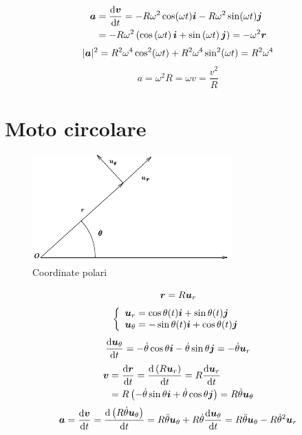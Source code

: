 \begin{align*}
\boldsymbol{a}&=\frac{\mathrm{d}\boldsymbol{v}}{\mathrm{d} t}=-R\omega^2\cos(\omega t)\boldsymbol{i}-R\omega^2\sin(\omega t)\boldsymbol{j}\\
&=-R\omega^2\left(\cos\left(\omega t\right)\boldsymbol{i}+
\sin\left(\omega t\right)\boldsymbol{j}\right)=-\omega^2\boldsymbol{r}
\end{align*}
\begin{equation*}|\boldsymbol{a}|^2=R^2\omega^4\cos^2(\omega t)+R^2\omega^4\sin^2(\omega
t)=R^2\omega^4\end{equation*}
\begin{equation*}a=\omega^2R=\omega v=\frac{v^2}{R}\end{equation*}
\section{Moto circolare}
\begin{figure}[htbp]
\centering
\includegraphics[scale=1]{immagini/fisica1/CorPol}
\caption{Coordinate polari}
\end{figure}
\begin{equation*}\boldsymbol{r}=R\boldsymbol{u}_r\end{equation*}
\begin{equation*}
\left\{\begin{array}{ll}
\boldsymbol{u}_r=\cos\theta(t)\boldsymbol{i}+\sin\theta(t)\boldsymbol{j}\\
\boldsymbol{u}_\theta=-\sin\theta(t)\boldsymbol{i}+\cos\theta(t)\boldsymbol{j}
\end{array}\right.
\end{equation*}
\begin{equation*}\frac{\mathrm{d}\boldsymbol{u}_\theta}{\mathrm{d} t}=-\dot{\theta}\cos\theta\boldsymbol{i}-\dot{\theta}\sin\theta\boldsymbol{j}=-\dot{\theta}\boldsymbol{u}_r\end{equation*}
\begin{align*}
\boldsymbol{v}&=\frac{\mathrm{d} \boldsymbol{r}}{\mathrm{d} t}=\frac{\mathrm{d}\left(R\boldsymbol{u}_r\right)}{\mathrm{d} t}=R\frac{\mathrm{d} \boldsymbol{u}_r}{\mathrm{d}
t}\\
&=R\left(-\dot\theta\sin\theta\boldsymbol{i}+\dot\theta\cos\theta\boldsymbol{j}\right)=R\dot\theta\boldsymbol{u}_\theta
\end{align*}
$$\boldsymbol{a}=\frac{\mathrm{d}\boldsymbol{v}}{\mathrm{d} t}=\frac{\mathrm{d}\left(R\dot\theta\boldsymbol{u}_\theta\right)}{\mathrm{d} t}=R\ddot\theta\boldsymbol{u}_\theta+R\dot\theta\frac{\mathrm{d}\boldsymbol{u}_\theta}{\mathrm{d}
t}=R\ddot\theta\boldsymbol{u}_\theta-R\dot\theta^2\boldsymbol{u}_r$$



